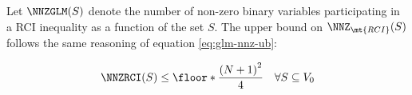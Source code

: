 Let $\NNZGLM(S)$ denote the number of non-zero binary variables participating in a RCI inequality as a function of the set $S$.
The upper bound on $\NNZ_{\mt{RCI}}(S)$ follows the same reasoning of equation \eqref{eq:glm-nnz-ub}:

\begin{equation}\label{eq:rc-nnz-ub}
	\NNZRCI(S) \le \floor*{\frac{\left( N + 1\right)^2}{4}} \quad \forall S \subseteq V_0
\end{equation}
